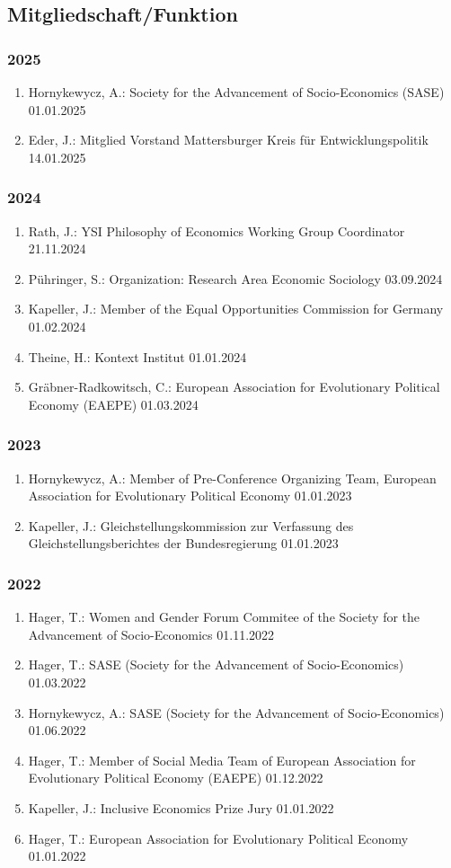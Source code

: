 \subsection{Mitgliedschaft/Funktion}
\subsubsection*{2025}
\begin{enumerate}
	\item Hornykewycz, A.: Society for the Advancement of Socio-Economics (SASE) 01.01.2025
	\item Eder, J.: Mitglied Vorstand Mattersburger Kreis für Entwicklungspolitik 14.01.2025
\end{enumerate}
\subsubsection*{2024}
\begin{enumerate}
	\item Rath, J.: YSI Philosophy of Economics Working Group Coordinator 21.11.2024
	\item Pühringer, S.: Organization: Research Area Economic Sociology 03.09.2024
	\item Kapeller, J.: Member of the Equal Opportunities Commission for Germany 01.02.2024
	\item Theine, H.: Kontext Institut 01.01.2024
	\item Gräbner-Radkowitsch, C.: European Association for Evolutionary Political Economy (EAEPE) 01.03.2024
\end{enumerate}
\subsubsection*{2023}
\begin{enumerate}
	\item Hornykewycz, A.: Member of Pre-Conference Organizing Team, European Association for Evolutionary Political Economy 01.01.2023
	\item Kapeller, J.: Gleichstellungskommission zur Verfassung des Gleichstellungsberichtes der Bundesregierung 01.01.2023
\end{enumerate}
\subsubsection*{2022}
\begin{enumerate}
	\item Hager, T.: Women and Gender Forum Commitee of the Society for the Advancement of Socio-Economics 01.11.2022
	\item Hager, T.: SASE (Society for the Advancement of Socio-Economics) 01.03.2022
	\item Hornykewycz, A.: SASE (Society for the Advancement of Socio-Economics) 01.06.2022
	\item Hager, T.: Member of Social Media Team of European Association for Evolutionary Political Economy (EAEPE) 01.12.2022
	\item Kapeller, J.: Inclusive Economics Prize Jury 01.01.2022
	\item Hager, T.: European Association for Evolutionary Political Economy 01.01.2022
\end{enumerate}
